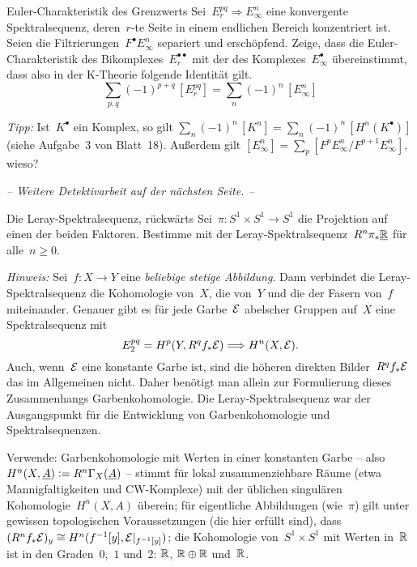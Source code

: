 \documentclass{uebblatt}
\begin{document}
\begin{aufgabe}{Euler-Charakteristik des Grenzwerts}
Sei~$E_r^{pq} \Rightarrow E^n_\infty$ eine konvergente Spektralsequenz,
deren~$r$-te Seite in einem endlichen Bereich konzentriert ist. Seien die
Filtrierungen~$F^\bullet E^n_\infty$ separiert und erschöpfend. Zeige, dass die
Euler-Charakteristik des Bikomplexes~$E_r^{\bullet\bullet}$ mit der des
Komplexes~$E_\infty^\bullet$ übereinstimmt, dass also in der K-Theorie folgende
Identität gilt.
\[ \sum_{p,q} (-1)^{p+q} \, [E_r^{pq}] = \sum_n (-1)^n \, [E_\infty^n] \]
{\tiny\emph{Tipp:} Ist~$K^\bullet$ ein Komplex, so gilt $\sum_n (-1)^n \, [K^n] =
\sum_n (-1)^n \, [H^n(K^\bullet)]$ (siehe Aufgabe~3 von Blatt~18). Außerdem gilt
$[E_\infty^n] = \sum_p [F^p E_\infty^n / F^{p+1} E_\infty^n]$, wieso?\par}
\end{aufgabe}

\begin{center}\emph{-- Weitere Detektivarbeit auf der nächsten Seite.
--}\end{center}
\newpage

\begin{aufgabe}{Die Leray-Spektralsequenz, rückwärts}
Sei~$\pi : S^1 \times S^1 \to S^1$ die Projektion auf einen der beiden
Faktoren. Bestimme mit der Leray-Spektralsequenz~$R^n \pi_* \underline{\mathbb{R}}$ für alle~$n
\geq 0$.

{\tiny\emph{Hinweis:}
Sei~$f : X \to Y$ eine \emph{beliebige stetige Abbildung}. Dann verbindet die
Leray-Spektralsequenz die Kohomologie von~$X$,
die von~$Y$ und die der Fasern von~$f$ miteinander. Genauer gibt es für jede
Garbe~$\mathcal{E}$ abelscher Gruppen auf~$X$ eine Spektralsequenz mit
\[ E_2^{pq} = H^p(Y, R^q f_* \mathcal{E}) \Longrightarrow H^n(X, \mathcal{E}). \]
Auch, wenn~$\mathcal{E}$ eine konstante Garbe ist, sind die höheren direkten Bilder~$R^q
f_* \mathcal{E}$ das im Allgemeinen nicht. Daher benötigt man allein zur Formulierung
dieses Zusammenhangs Garbenkohomologie. Die Leray-Spektralsequenz war der
Ausgangspunkt für die Entwicklung von Garbenkohomologie und
Spektralsequenzen.\par Verwende: Garbenkohomologie mit Werten in einer
konstanten Garbe -- also $H^n(X, \underline{A}) \vcentcolon= R^n \Gamma_X(\underline{A})$ -- stimmt
für lokal zusammenziehbare Räume (etwa Mannigfaltigkeiten und CW-Komplexe) mit
der üblichen singulären Kohomologie~$H^n(X, A)$ überein; für eigentliche
Abbildungen (wie~$\pi$) gilt unter gewissen topologischen Voraussetzungen (die
hier erfüllt sind), dass~$(R^n f_* \mathcal{E})_y \cong H^n(f^{-1}[y],
\mathcal{E}|_{f^{-1}[y]})$; die Kohomologie von~$S^1 \times S^1$ mit Werten in~$\mathbb{R}$
ist in den Graden~$0$,~$1$ und~$2$: $\mathbb{R}$, $\mathbb{R} \oplus \mathbb{R}$ und~$\mathbb{R}$.\par}
\end{aufgabe}
\end{document}

